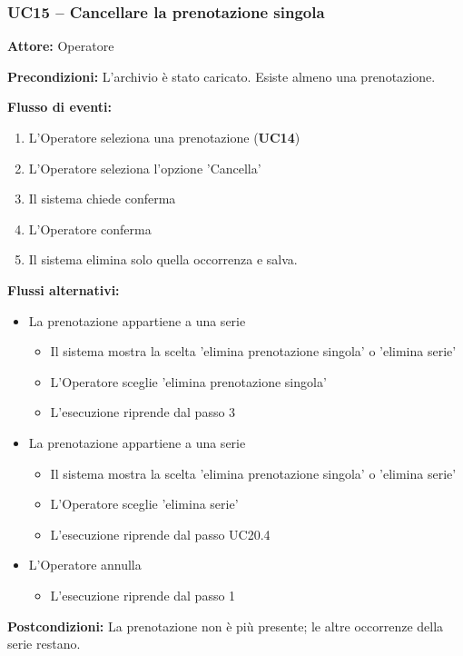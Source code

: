 \documentclass[a4paper,11pt]{article}
\begin{document}
\begin{samepage}
\subsubsection*{UC15 -- Cancellare la prenotazione singola}
\begin{ucbox}

\noindent\textbf{Attore:} Operatore\par
\noindent\textbf{Precondizioni:} L'archivio è stato caricato. Esiste almeno una prenotazione.\par

\noindent\textbf{Flusso di eventi:}
\begin{enumerate}
\item L'Operatore seleziona una prenotazione (\textbf{UC14})\item L'Operatore seleziona l'opzione 'Cancella' \item Il sistema chiede conferma \item L'Operatore conferma \item Il sistema elimina solo quella occorrenza e salva. \end{enumerate}
\noindent\textbf{Flussi alternativi:}
\begin{itemize}
\item[2a.] La prenotazione appartiene a una serie
\begin{itemize}
\item Il sistema mostra la scelta 'elimina prenotazione singola' o 'elimina serie'
\item L'Operatore sceglie 'elimina prenotazione singola'
\item L'esecuzione riprende dal passo 3
\end{itemize}
\item[2b.] La prenotazione appartiene a una serie
\begin{itemize}
\item Il sistema mostra la scelta 'elimina prenotazione singola' o 'elimina serie'
\item L'Operatore sceglie 'elimina serie'
\item L'esecuzione riprende dal passo UC20.4
\end{itemize}
\item[4a.] L'Operatore annulla
\begin{itemize}
\item L'esecuzione riprende dal passo 1
\end{itemize}
\end{itemize}
\noindent\textbf{Postcondizioni:} La prenotazione non è più presente; le altre occorrenze della serie restano.\par
\end{ucbox}
\end{samepage}
\end{document}
